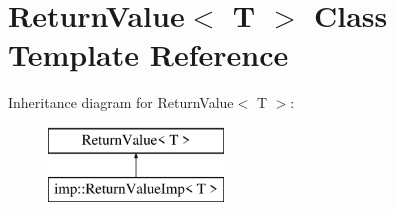 \hypertarget{class_return_value}{}\section{Return\+Value$<$ T $>$ Class Template Reference}
\label{class_return_value}
Inheritance diagram for Return\+Value$<$ T $>$\+:\begin{figure}[H]
\begin{center}
\leavevmode
\includegraphics[height=2.000000cm]{class_return_value}
\end{center}
\end{figure}
